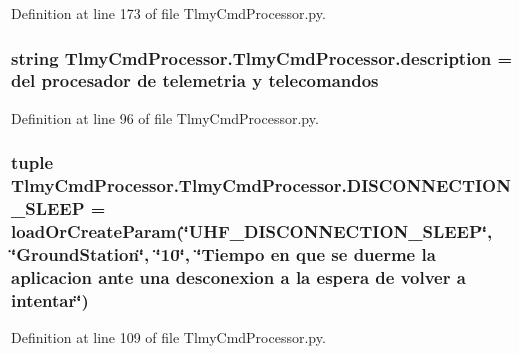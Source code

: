 Definition at line 173 of file Tlmy\+Cmd\+Processor.\+py.

\hypertarget{namespace_tlmy_cmd_processor_1_1_tlmy_cmd_processor_af826240cd995d7339c5f281ee8941333}{}
\subsubsection[{description}]{\setlength{\rightskip}{0pt plus 5cm}string Tlmy\+Cmd\+Processor.\+Tlmy\+Cmd\+Processor.\+description =  del procesador de telemetria y telecomandos\textquotesingle{}}\label{namespace_tlmy_cmd_processor_1_1_tlmy_cmd_processor_af826240cd995d7339c5f281ee8941333}


Definition at line 96 of file Tlmy\+Cmd\+Processor.\+py.

\hypertarget{namespace_tlmy_cmd_processor_1_1_tlmy_cmd_processor_a053a883aeff5a224089cd5c791e2bc4c}{}
\subsubsection[{D\+I\+S\+C\+O\+N\+N\+E\+C\+T\+I\+O\+N\+\_\+\+S\+L\+E\+E\+P}]{\setlength{\rightskip}{0pt plus 5cm}tuple Tlmy\+Cmd\+Processor.\+Tlmy\+Cmd\+Processor.\+D\+I\+S\+C\+O\+N\+N\+E\+C\+T\+I\+O\+N\+\_\+\+S\+L\+E\+E\+P = load\+Or\+Create\+Param(\char`\"{}U\+H\+F\+\_\+\+D\+I\+S\+C\+O\+N\+N\+E\+C\+T\+I\+O\+N\+\_\+\+S\+L\+E\+E\+P\char`\"{}, \char`\"{}Ground\+Station\char`\"{}, \char`\"{}10\char`\"{}, \char`\"{}Tiempo en que se duerme la aplicacion ante una desconexion {\bf a} la espera de volver {\bf a} intentar\char`\"{})}\label{namespace_tlmy_cmd_processor_1_1_tlmy_cmd_processor_a053a883aeff5a224089cd5c791e2bc4c}


Definition at line 109 of file Tlmy\+Cmd\+Processor.\+py.

\hypertarget{namespace_tlmy_cmd_processor_1_1_tlmy_cmd_processor_a8f2365862c9bbb4fe399b2d3f801b4d5}{}
